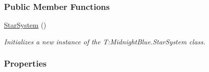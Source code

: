 \subsubsection*{Public Member Functions}
\begin{DoxyCompactItemize}
\item 
\hyperlink{class_midnight_blue_1_1_star_system_a781acf7d61cc1609bc0f5db94593a963}{Star\+System} ()
\begin{DoxyCompactList}\small\item\em Initializes a new instance of the T\+:\+Midnight\+Blue.\+Star\+System class. \end{DoxyCompactList}\end{DoxyCompactItemize}
\subsubsection*{Properties}
